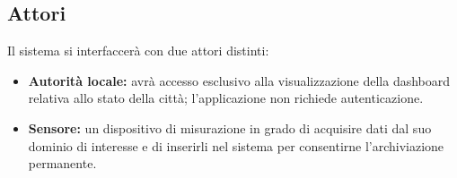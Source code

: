 \subsection{Attori}
Il sistema si interfaccerà con due attori distinti:

\begin{itemize}
    \item \textbf{Autorità locale:} avrà accesso esclusivo alla visualizzazione della dashboard relativa allo stato della città; l'applicazione non richiede autenticazione.  
    \item \textbf{Sensore:} un dispositivo di misurazione in grado di acquisire dati dal suo dominio di interesse e di inserirli nel sistema per consentirne l'archiviazione permanente.  
\end{itemize}